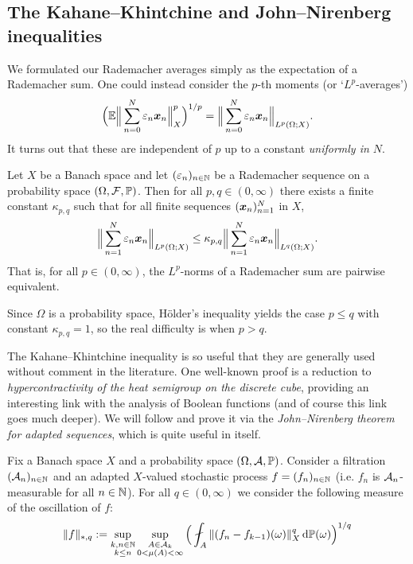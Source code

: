 \subsection{The Kahane--Khintchine and John--Nirenberg inequalities}

We formulated our Rademacher averages simply as the expectation of a Rademacher sum.
One could instead consider the $p$-th moments (or `$L^p$-averages')
\begin{equation*}
  \Big( \mathbb{E} \Big\| \sum_{n=0}^{N} \varepsilon_{n} \bm{x}_{n} \Big\|_{X}^{p} \Big)^{1/p} = \Big\| \sum_{n=0}^{N} \varepsilon_{n} \bm{x}_{n} \Big\|_{L^p(\Omega;X)}.
\end{equation*}
It turns out that these are independent of $p$ up to a constant \emph{uniformly in $N$}.

\begin{thm}\label{thm:kk}
  Let $X$ be a Banach space and let $(\varepsilon_{n})_{n \in \mathbb{N}}$ be a Rademacher sequence on a probability space $(\Omega,\mathcal{F},\mathbb{P})$.
  Then for all $p,q \in (0,\infty)$ there exists a finite constant $\kappa_{p,q}$ such that for all finite sequences $(\bm{x}_n)_{n=1}^N$ in $X$,
  \begin{equation*}
    \Big\|\sum_{n=1}^{N} \varepsilon_{n} \bm{x}_{n} \Big\|_{L^p(\Omega;X)} \leq \kappa_{p,q} \Big\|\sum_{n=1}^{N} \varepsilon_{n} \bm{x}_{n} \Big\|_{L^q(\Omega;X)}.
  \end{equation*}
  That is, for all $p \in (0,\infty)$, the $L^p$-norms of a Rademacher sum are pairwise equivalent.  
\end{thm}

Since $\Omega$ is a probability space, H\"older's inequality yields the case $p \leq q$ with constant $\kappa_{p,q} = 1$, so the real difficulty is when $p > q$.

The Kahane--Khintchine inequality is so useful that they are generally used without comment in the literature.
One well-known proof is a reduction to \emph{hypercontractivity of the heat semigroup on the discrete cube}, providing an interesting link with the analysis of Boolean functions (and of course this link goes much deeper).
We will follow \cite{HNVW16} and prove it via the \emph{John--Nirenberg theorem for adapted sequences}, which is quite useful in itself.

Fix a Banach space $X$ and a probability space $(\Omega,\mathcal{A},\mathbb{P})$.
Consider a filtration $(\mathcal{A}_n)_{n \in \mathbb{N}}$ and an adapted $X$-valued stochastic process $f = (f_n)_{n \in \mathbb{N}}$ (i.e. $f_n$ is $\mathcal{A}_n$-measurable for all $n \in \mathbb{N}$).
For all $q \in (0,\infty)$ we consider the following measure of the oscillation of $f$:
\begin{equation*}
    \|f\|_{*,q} := \sup_{\substack{k,n \in \N \\ k \leq n}} \sup_{\substack{A \in \mc{A}_k \\ 0 < \mu(A) < \infty}} \Big( \fint_{A} \|(f_n - f_{k-1})(\omega)\|_{X}^{q} \, \dd\P(\omega)\Big)^{1/q}
\end{equation*}

